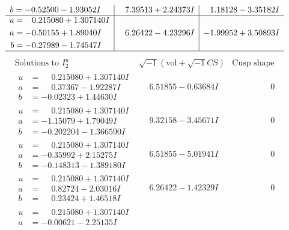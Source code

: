 \documentclass[1p]{elsarticle_modified}
\theoremstyle{definition}
\newcommand{\I}{\sqrt{-1}}
\begin{document}
$$\begin{array}{c|c|c}
\begin{aligned}
b &= -0.52500 - 1.93052 I\end{aligned}
 & \phantom{-}7.39513 + 2.24373 I & \phantom{-}1.18128 - 3.35182 I \\ \hline\begin{aligned}
u &= \phantom{-}0.215080 + 1.307140 I \\
a &= -0.50155 + 1.89040 I \\
b &= -0.27989 - 1.74547 I\end{aligned}
 & \phantom{-}6.26422 - 4.23296 I & -1.99952 + 3.50893 I\\
 \hline 
 \end{array}$$\newpage$$\begin{array}{c|c|c}  
\text{Solutions to }I^u_{2}& \I (\text{vol} + \sqrt{-1}CS) & \text{Cusp shape}\\
 \hline 
\begin{aligned}
u &= \phantom{-}0.215080 + 1.307140 I \\
a &= \phantom{-}0.37367 - 1.92287 I \\
b &= -0.02323 + 1.44630 I\end{aligned}
 & \phantom{-}6.51855 - 0.63684 I & \phantom{-0.000000 } 0 \\ \hline\begin{aligned}
u &= \phantom{-}0.215080 + 1.307140 I \\
a &= -1.15079 + 1.79049 I \\
b &= -0.202204 - 1.366590 I\end{aligned}
 & \phantom{-}9.32158 - 3.45671 I & \phantom{-0.000000 } 0 \\ \hline\begin{aligned}
u &= \phantom{-}0.215080 + 1.307140 I \\
a &= -0.35992 + 2.15275 I \\
b &= -0.148313 - 1.389180 I\end{aligned}
 & \phantom{-}6.51855 - 5.01941 I & \phantom{-0.000000 } 0 \\ \hline\begin{aligned}
u &= \phantom{-}0.215080 + 1.307140 I \\
a &= \phantom{-}0.82724 - 2.03016 I \\
b &= \phantom{-}0.23424 + 1.46518 I\end{aligned}
 & \phantom{-}6.26422 - 1.42329 I & \phantom{-0.000000 } 0 \\ \hline\begin{aligned}
u &= \phantom{-}0.215080 + 1.307140 I \\
a &= -0.00621 - 2.25135 I \\

\end{aligned}
\end{array}$$
\end{document}
